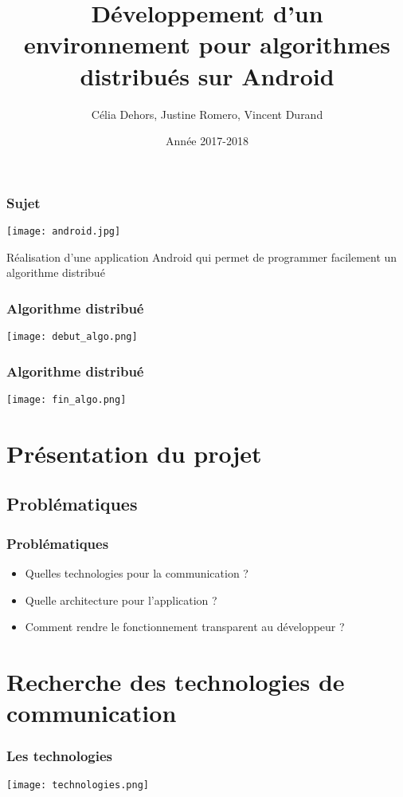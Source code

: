 \documentclass{beamer}
\title{Développement d’un environnement pour algorithmes distribués sur Android}
\author{Célia Dehors, Justine Romero, Vincent Durand}
\institute{Université de Franche-Comté}
\date{Année 2017-2018}
\begin{document}
    \begin{frame}[plain]
        \titlepage
    \end{frame}
	\begin{frame}
	  \frametitle{Sujet}
	  \begin{wrapfigure}
      \begin{center}
        \texttt{[image: android.jpg]}
      \end{center}
      \end{wrapfigure}
	  Réalisation d’une application Android qui permet de programmer facilement un algorithme distribué
        \end{frame}
    \begin{frame}
	  \frametitle{Algorithme distribué}
	  \texttt{[image: debut\_algo.png]}
	  \end{frame}
	\begin{frame}
	  \frametitle{Algorithme distribué}
	  \texttt{[image: fin\_algo.png]}
	  \end{frame}
    \begin{frame}
        \tableofcontents
    \end{frame}
    \section{Présentation du projet}
      \subsection{Problématiques}
        \begin{frame}
	  \frametitle{Problématiques}
	  \begin{itemize}
	   \item Quelles technologies pour la communication ?
	   \item Quelle architecture pour l'application ?
	   \item Comment rendre le fonctionnement transparent au développeur ?
	  \end{itemize}

        \end{frame}
    
    \section{Recherche des technologies de communication}
      \begin{frame}
	\frametitle{Les technologies}
	\texttt{[image: technologies.png]}
      \end{frame}
\end{document}
